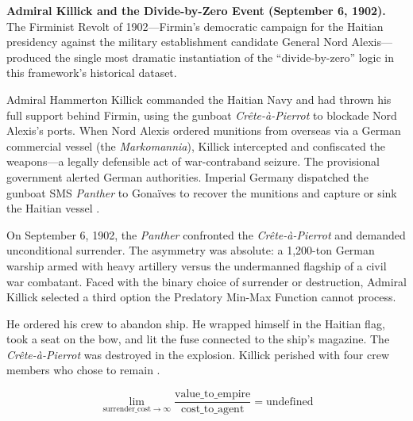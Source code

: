 \textbf{Admiral Killick and the Divide-by-Zero Event (September 6, 1902).} The Firminist Revolt of 1902---Firmin's democratic campaign for the Haitian presidency against the military establishment candidate General Nord Alexis---produced the single most dramatic instantiation of the ``divide-by-zero'' logic in this framework's historical dataset.

Admiral Hammerton Killick commanded the Haitian Navy and had thrown his full support behind Firmin, using the gunboat \textit{Crête-à-Pierrot} to blockade Nord Alexis's ports. When Nord Alexis ordered munitions from overseas via a German commercial vessel (the \textit{Markomannia}), Killick intercepted and confiscated the weapons---a legally defensible act of war-contraband seizure. The provisional government alerted German authorities. Imperial Germany dispatched the gunboat SMS \textit{Panther} to Gonaïves to recover the munitions and capture or sink the Haitian vessel \cite{firmin_legacy}.

On September 6, 1902, the \textit{Panther} confronted the \textit{Crête-à-Pierrot} and demanded unconditional surrender. The asymmetry was absolute: a 1,200-ton German warship armed with heavy artillery versus the undermanned flagship of a civil war combatant. Faced with the binary choice of surrender or destruction, Admiral Killick selected a third option the Predatory Min-Max Function cannot process.

He ordered his crew to abandon ship. He wrapped himself in the Haitian flag, took a seat on the bow, and lit the fuse connected to the ship's magazine. The \textit{Crête-à-Pierrot} was destroyed in the explosion. Killick perished with four crew members who chose to remain \cite{firmin_legacy}.

\begin{equation}\label{eq:13.4-killick-extraction-equation}
\lim_{\text{surrender\_cost} \to \infty} \frac{\text{value\_to\_empire}}{\text{cost\_to\_agent}} = \text{undefined}
\end{equation}

